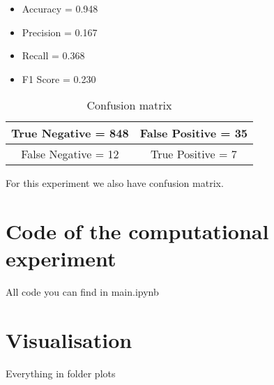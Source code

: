 \documentclass{article}
\begin{document}
\begin{itemize}
    \item Accuracy =  0.948
    \item Precision =  0.167
    \item Recall =  0.368
    \item F1 Score =  0.230
\end{itemize}


\begin{wraptable}{r}{0.5\linewidth}
		\begin{tabular}{|c|c|}
			\hline
			True Negative = 848 & False Positive = 35 \\ \hline
			False Negative = 12 &  True Positive = 7 \\ \hline
		\end{tabular}
		\caption{Confusion matrix}
\end{wraptable}For this experiment we also have confusion matrix.

\section{Code of the computational experiment}
All code you can find in main.ipynb

\section{Visualisation}
Everything in folder plots
\end{document}
